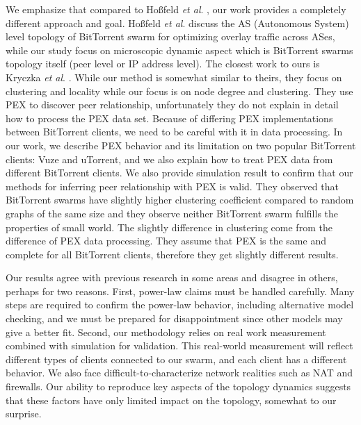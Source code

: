 We emphasize that compared to Ho\ss{}feld \textit{et al}. \cite{TR464}, our work provides a completely different approach and goal.
Ho\ss{}feld \textit{et al}. \cite{TR464} discuss the AS (Autonomous System) level topology of BitTorrent swarm for optimizing overlay traffic across ASes, while our study focus on microscopic dynamic aspect which is BitTorrent swarms topology itself (peer level or IP address level). 
The closest work to ours is Kryczka \textit{et al}. \cite{Kryczka2011}.
While our method is somewhat similar to theirs, they focus on clustering and locality while our focus is on node degree and clustering.
They use PEX to discover peer relationship, unfortunately they do not explain in detail how to process the PEX data set.
Because of differing PEX implementations between BitTorrent clients, we need to be careful with it in data processing.  
In our work, we describe PEX behavior and its limitation on two popular BitTorrent clients: Vuze and uTorrent, and we also explain how to treat PEX data from different BitTorrent clients. 
We also provide simulation result to confirm that our methods for inferring peer relationship with PEX is valid.  
They observed that BitTorrent swarms have slightly higher clustering coefficient compared to random graphs of the same size and they observe neither BitTorrent swarm fulfills the properties of small world.
The slightly difference in clustering come from the difference of PEX data processing. 
They assume that PEX is the same and complete for all BitTorrent clients, therefore they get slightly different results. 

Our results agree with previous research \cite{dale2008evolution} in some areas and disagree in others, perhaps for two reasons.
First, power-law claims must be handled carefully. 
Many steps are required to confirm the power-law behavior, including alternative model checking, and we must be prepared for disappointment since other models may give a better fit. 
Second, our methodology relies on real work measurement combined with simulation for validation. 
This real-world measurement will reflect different types of clients connected to our swarm, and each client has a different behavior. 
We also face difficult-to-characterize network realities such as NAT and firewalls. 
Our ability to reproduce key aspects of the topology dynamics suggests that these factors have only limited impact on the topology, somewhat to our surprise.

